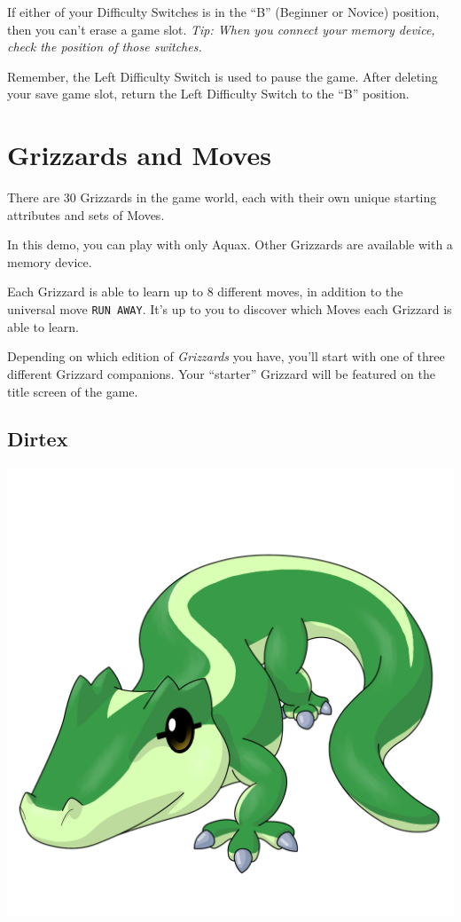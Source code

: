 \documentclass[10pt,twocolumn,openany,article]{memoir}
\begin{document}
\begin{description}
If  either of  your Difficulty  Switches is  in the  ``B'' (Beginner  or
Novice) position, then you can't erase  a game slot. \emph{Tip: When you
  connect your memory device, check the position of those switches.}

\ifdefined\TVSECAM

Remember,  the  Left  Difficulty  Switch  is used  to  pause  the  game.
After deleting your save game slot, return the Left Difficulty Switch to
the ``B'' position.

\fi

\fi %
\chapter{Grizzards and Moves}

There are  30 Grizzards in  the game world,  each with their  own unique
starting attributes and sets of Moves.

\ifdefined\NOSAVE

In  this  demo, you  can  play  with  only  Aquax. Other  Grizzards  are
available with a memory device.

\fi

Each Grizzard is able  to learn up to 8 different  moves, in addition to
the universal move  \texttt{RUN AWAY}. It's up to you  to discover which
Moves each  Grizzard is  able to  learn.

\ifdefined\DEMO\else

Depending on which edition of  \textit{Grizzards} you have, you'll start
with  one  of  three  different Grizzard  companions.  Your  ``starter''
Grizzard will be featured on the title screen of the game.

\section{Dirtex}

\includegraphics[width=\columnwidth]{../Manual/Dirtex.png}


\end{description}
\end{document}
